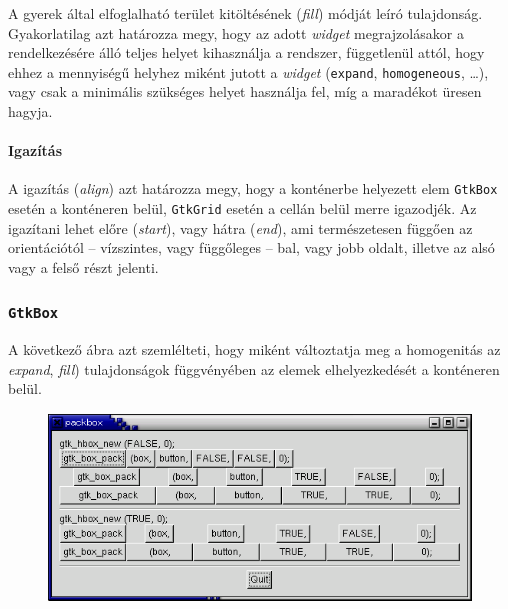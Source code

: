 A gyerek által elfoglalható terület kitöltésének (\textit{fill}) módját leíró tulajdonság. Gyakorlatilag azt határozza megy, hogy az adott \textit{widget} megrajzolásakor a rendelkezésére álló teljes helyet kihasználja a rendszer, függetlenül attól, hogy ehhez a mennyiségű helyhez miként jutott a \textit{widget} (\texttt{expand}, \texttt{homogeneous}, \dots), vagy csak a minimális szükséges helyet használja fel, míg a maradékot üresen hagyja.

\paragraph{Igazítás}

A igazítás (\textit{align}) azt határozza megy, hogy a konténerbe helyezett elem \texttt{GtkBox} esetén a konténeren belül, \texttt{GtkGrid} esetén a cellán belül merre igazodjék. Az igazítani lehet előre (\textit{start}), vagy hátra (\textit{end}), ami természetesen függően az orientációtól -- vízszintes, vagy függőleges -- bal, vagy jobb oldalt, illetve az alsó vagy a felső részt jelenti.

\subsubsection{\texttt{GtkBox}}

A következő ábra azt szemlélteti, hogy miként változtatja meg a homogenitás az \textit{expand}, \textit{fill}) tulajdonságok függvényében az elemek elhelyezkedését a konténeren belül.

\vspace{12 pt}
\begin{figure}[H]
\begin{center}
\includegraphics[height=50mm]{images/packbox1.png}
\end{center}
\end{figure}

